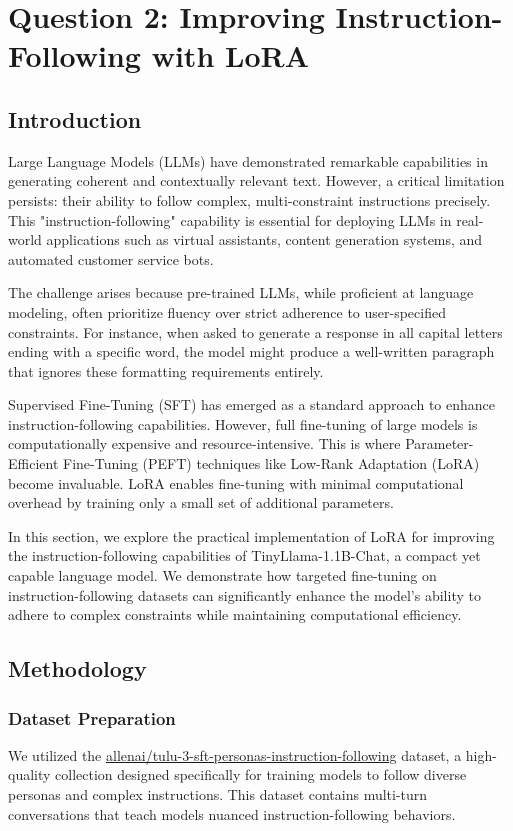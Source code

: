 \section{Question 2: Improving Instruction-Following with LoRA}

\subsection{Introduction}
Large Language Models (LLMs) have demonstrated remarkable capabilities in generating coherent and contextually relevant text. However, a critical limitation persists: their ability to follow complex, multi-constraint instructions precisely. This "instruction-following" capability is essential for deploying LLMs in real-world applications such as virtual assistants, content generation systems, and automated customer service bots.

The challenge arises because pre-trained LLMs, while proficient at language modeling, often prioritize fluency over strict adherence to user-specified constraints. For instance, when asked to generate a response in all capital letters ending with a specific word, the model might produce a well-written paragraph that ignores these formatting requirements entirely.

Supervised Fine-Tuning (SFT) has emerged as a standard approach to enhance instruction-following capabilities. However, full fine-tuning of large models is computationally expensive and resource-intensive. This is where Parameter-Efficient Fine-Tuning (PEFT) techniques like Low-Rank Adaptation (LoRA) become invaluable. LoRA enables fine-tuning with minimal computational overhead by training only a small set of additional parameters.

In this section, we explore the practical implementation of LoRA for improving the instruction-following capabilities of TinyLlama-1.1B-Chat, a compact yet capable language model. We demonstrate how targeted fine-tuning on instruction-following datasets can significantly enhance the model's ability to adhere to complex constraints while maintaining computational efficiency.

\subsection{Methodology}

\subsubsection{Dataset Preparation}
We utilized the \url{allenai/tulu-3-sft-personas-instruction-following} dataset, a high-quality collection designed specifically for training models to follow diverse personas and complex instructions. This dataset contains multi-turn conversations that teach models nuanced instruction-following behaviors.

